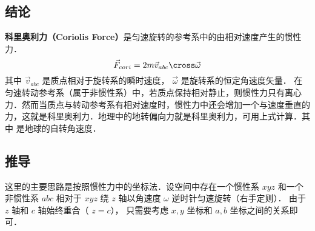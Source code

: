 
\subsection{结论}
\textbf{科里奥利力（Coriolis Force）}是匀速旋转的参考系中的由相对速度产生的惯性力．
\begin{equation}
{\vec F_{cori}} = 2m{\vec v_{abc}} \cross \vec \omega
\end{equation}
其中 $\vec v_{abc}$ 是质点相对于旋转系的瞬时速度， $\vec\omega$ 是旋转系的恒定角速度矢量．%
在匀速转动参考系（属于非惯性系）中，若质点保持相对静止，则惯性力只有离心力．然而当质点与转动参考系有相对速度时，惯性力中还会增加一个与速度垂直的力，这就是科里奥利力．地理中的地转偏向力就是科里奥利力，可用上式计算．其中 是地球的自转角速度．

\subsection{推导}
这里的主要思路是按照惯性力中的坐标法．设空间中存在一个惯性系 $xyz$ 和一个非惯性系 $abc$ 相对于 $xyz$ 绕 $z$ 轴以角速度 $\omega$ 逆时针匀速旋转（右手定则）．%
由于 $z$ 轴和 $c$ 轴始终重合（ $z=c$）， 只需要考虑 $x,y$ 坐标和 $a,b$ 坐标之间的关系即可．

